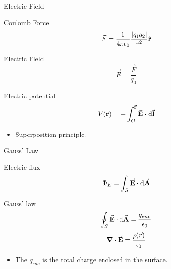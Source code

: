 \documentclass{beamer}
\begin{document}
\begin{frame}{Electric Field}	
	\begin{block}{Coulomb Force}
		\begin{equation}
			\vec{F} = \frac{1}{4\pi\epsilon_0} \frac{\abs{q_1 q_2}}{r^2} \vu{r}
		\end{equation}	
    \end{block}

    \begin{block}{Electric Field}
        \begin{equation}
			\vec{E} = \frac{\vec{F}}{q_0}
		\end{equation}
    \end{block}
    
    \begin{block}{Electric potential}
        \begin{equation}
            V(\va{r}) = -\int_O^{\va{r}} \va{E} \vdot \dd{\va{l}}
        \end{equation}
    \end{block}

	\begin{itemize}
        \item Superposition principle.
	\end{itemize}
\end{frame}


\begin{frame}{Gauss' Law}
	\begin{beamerboxesrounded}{Electric flux}
		\begin{equation}
			\Phi_E = \int_{S} \va{E} \vdot \dd{\va{A}}
		\end{equation}
	\end{beamerboxesrounded}
	\vspace{1em}
	\begin{beamerboxesrounded}{Gauss' law}
		\begin{equation}
			\oint_{S} \va{E} \cdot \dd{\va{A}} = \frac{q_{enc}}{\epsilon_0}
		\end{equation}
		\begin{equation}
			\div \va{E} = \frac{\rho(\vec{r})}{\epsilon_0}
		\end{equation}
	\end{beamerboxesrounded}
	\begin{itemize}
		\item The $q_{enc}$ is the total charge enclosed in the surface.
	\end{itemize}
\end{frame}
\end{document}

